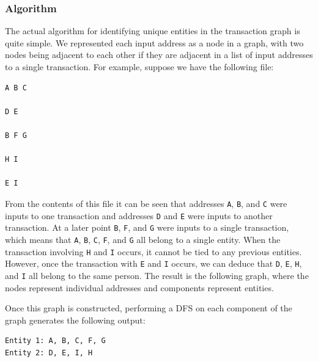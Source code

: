 \documentclass[11pt]{article}
\begin{document}
\subsubsection{Algorithm}
The actual algorithm for identifying unique entities in the transaction graph is quite simple.
We represented each input address as a node in a graph, with two nodes being adjacent to each other if they are adjacent
in a list of input addresses to a single transaction. For example, suppose we have the following file:
\begin{verbatim}
A B C

D E

B F G

H I

E I
\end{verbatim}

From the contents of this file it can be seen that addresses \texttt{A}, \texttt{B}, and \texttt{C} were inputs to one
transaction and addresses \texttt{D} and \texttt{E} were inputs to another transaction. At a later point \texttt{B},
\texttt{F}, and \texttt{G} were inputs to a single transaction, which means that \texttt{A}, \texttt{B}, \texttt{C},
\texttt{F}, and \texttt{G} all belong to a single entity. When the transaction involving \texttt{H} and \texttt{I}
occurs, it cannot be tied to any previous entities. However, once the transaction with \texttt{E} and \texttt{I} occurs,
we can deduce that \texttt{D}, \texttt{E}, \texttt{H}, and \texttt{I} all belong to the same person. The result is the
following graph, where the nodes represent individual addresses and components represent entities.

\begin{center}
\end{center}

Once this graph is constructed, performing a DFS on each component of the graph generates the following output:
\begin{verbatim}
Entity 1: A, B, C, F, G
Entity 2: D, E, I, H
\end{verbatim}
\end{document}
